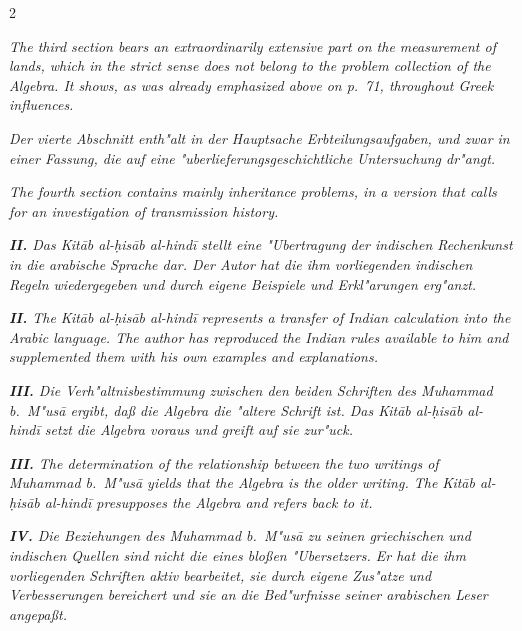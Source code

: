 \documentclass[10pt,a4paper]{article}
\begin{document}
\begin{paracol}{2}
\switchcolumn

\textit{The third section bears an extraordinarily extensive part on the measurement of lands, which in the strict sense does not belong to the problem collection of the Algebra. It shows, as was already emphasized above on p.\ 71, throughout Greek influences.}

\switchcolumn*

\textit{Der vierte Abschnitt enth"alt in der Hauptsache Erbteilungsaufgaben, und zwar in einer Fassung, die auf eine "uberlieferungsgeschichtliche Untersuchung dr"angt.}

\switchcolumn

\textit{The fourth section contains mainly inheritance problems, in a version that calls for an investigation of transmission history.}

\switchcolumn*

\textit{\textbf{II.} Das \textit{Kit\=ab al-\d{h}is\=ab al-hind\=i} stellt eine "Ubertragung der indischen Rechenkunst in die arabische Sprache dar. Der Autor hat die ihm vorliegenden indischen Regeln wiedergegeben und durch eigene Beispiele und Erkl"arungen erg"anzt.}

\switchcolumn

\textit{\textbf{II.} The \textit{Kit\=ab al-\d{h}is\=ab al-hind\=i} represents a transfer of Indian calculation into the Arabic language. The author has reproduced the Indian rules available to him and supplemented them with his own examples and explanations.}

\switchcolumn*

\textit{\textbf{III.} Die Verh"altnisbestimmung zwischen den beiden Schriften des Muhammad b.\ M"us\=a ergibt, da\ss{} die \textit{Algebra} die "altere Schrift ist. Das \textit{Kit\=ab al-\d{h}is\=ab al-hind\=i} setzt die \textit{Algebra} voraus und greift auf sie zur"uck.}

\switchcolumn

\textit{\textbf{III.} The determination of the relationship between the two writings of Muhammad b.\ M"us\=a yields that the \textit{Algebra} is the older writing. The \textit{Kit\=ab al-\d{h}is\=ab al-hind\=i} presupposes the \textit{Algebra} and refers back to it.}

\switchcolumn*

\textit{\textbf{IV.} Die Beziehungen des Muhammad b.\ M"us\=a zu seinen griechischen und indischen Quellen sind nicht die eines blo\ss{}en "Ubersetzers. Er hat die ihm vorliegenden Schriften aktiv bearbeitet, sie durch eigene Zus"atze und Verbesserungen bereichert und sie an die Bed"urfnisse seiner arabischen Leser angepa\ss{}t.}


\end{paracol}
\end{document}
